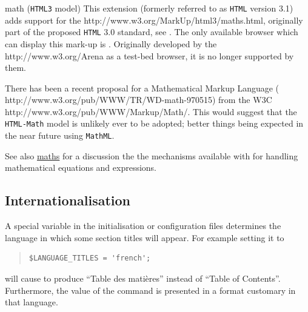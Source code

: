 \begin{htmllist}
%
%
%
%
\item[math (\texttt{HTML3} model) \strikeout{Version 3.1}]
This extension (formerly referred to as \texttt{HTML} version 3.1)
adds support for the %
{http://www.w3.org/MarkUp/html3/maths.html}, originally
part of the proposed \texttt{HTML} 3.0 standard, see .
The only available browser
which can display this mark-up is .
Originally developed by the %
{http://www.w3.org/Arena} as a test-bed browser,
it is no longer supported by them.

There has been a recent proposal for a Mathematical Markup Language
(%
{http://www.w3.org/pub/WWW/TR/WD-math-970515}) 
from the W3C %
{http://www.w3.org/pub/WWW/Markup/Math/}. 
This would suggest that the \texttt{HTML-Math} model is unlikely 
ever to be adopted; better things being expected in the near future
using \texttt{MathML}.

See also \hyperref{another page}{Section~}{}{maths} for a discussion
the the mechanisms available with \latextohtml{} for handling
mathematical equations and expressions.
\end{htmllist}




\subsection{Internationalisation\label{internat}}%
\html{\\}%
A special variable  
in the initialisation or configuration files determines the language 
in which some section titles will appear. For example setting it to 
\begin{quote}
\begin{verbatim}
$LANGUAGE_TITLES = 'french';
\end{verbatim}
\end{quote}
will cause \latextohtml{} to produce ``Table des mati{\`e}res'' instead of
``Table of Contents''.
Furthermore, the value of the  command is presented in a format
customary in that language.

